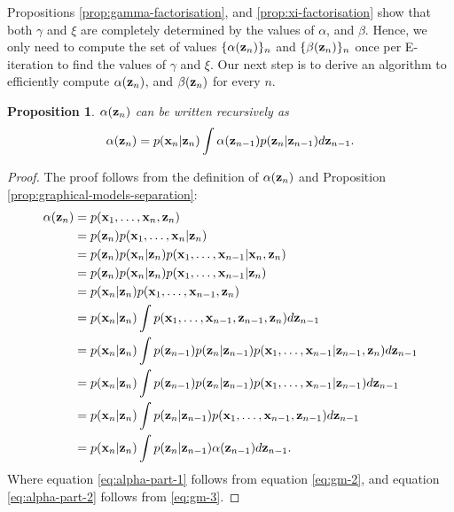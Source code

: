 \documentclass[11pt]{article}
\numberwithin{equation}{section}
\newcommand{\x}{{\bf x}}
\newcommand{\z}{{\bf z}}
\newtheorem{proposition}{Proposition}[section]
\begin{document}
Propositions \ref{prop:gamma-factorisation}, and \ref{prop:xi-factorisation} show that both $\gamma$ and $\xi$ are completely determined by the values of $\alpha$, and $\beta$. Hence, we only need to compute the set of values $\{\alpha(\z_n)\}_n$ and $\{\beta(\z_n)\}_n$ once per E-iteration to find the values of $\gamma$ and $\xi$. Our next step is to derive an algorithm to efficiently compute $\alpha(\z_n)$, and $\beta(\z_n)$ for every $n$.


\begin{proposition} \label{prop:alpha-recursive}
	$\alpha(\z_n)$ can be written recursively as
	\begin{equation}
		\alpha(\z_n) = p(\x_n\vert \z_n) \int \alpha(\z_{n-1})p(\z_n\vert\z_{n-1}) d\z_{n-1}.
	\end{equation}
\end{proposition}

\begin{proof}
	The proof follows from the definition of $\alpha(\z_n)$ and Proposition \ref{prop:graphical-models-separation}:
	\begin{align}
		\alpha(\z_n) &= p(\x_1, \ldots, \x_n, \z_n) \\
		&= p(\z_n) p(\x_1, \ldots, \x_n \vert \z_n) \\
		&= p(\z_n) p(\x_n \vert \z_n) p(\x_1, \ldots, \x_{n-1} \vert \x_n, \z_n) \\
		&= p(\z_n) p(\x_n \vert \z_n) p(\x_1, \ldots, \x_{n-1} \vert \z_n) \label{eq:alpha-part-1}\\
		&= p(\x_n \vert \z_n) p(\x_1, \ldots, \x_{n-1}, \z_n) \\
		&= p(\x_n \vert \z_n) \int p(\x_1, \ldots, \x_{n-1}, \z_{n-1}, \z_n) d\z_{n-1}\\
		&= p(\x_n \vert \z_n) \int p(\z_{n-1})p(\z_n \vert \z_{n-1})p(\x_1, \ldots, \x_{n-1} \vert \z_{n-1}, \z_n) d\z_{n-1}\\
		&= p(\x_n \vert \z_n) \int p(\z_{n-1})p(\z_n \vert \z_{n-1})p(\x_1, \ldots, \x_{n-1} \vert \z_{n-1}) d\z_{n-1} \label{eq:alpha-part-2}\\ 
		&= p(\x_n \vert \z_n) \int p(\z_n \vert \z_{n-1})p(\x_1, \ldots, \x_{n-1}, \z_{n-1}) d\z_{n-1}\\
		&= p(\x_n \vert \z_n) \int p(\z_n \vert \z_{n-1})\alpha(\z_{n-1}) d\z_{n-1}.
	\end{align}
	Where equation \eqref{eq:alpha-part-1} follows from equation \eqref{eq:gm-2}, and equation \eqref{eq:alpha-part-2} follows from \eqref{eq:gm-3}.
\end{proof}
\end{document}
